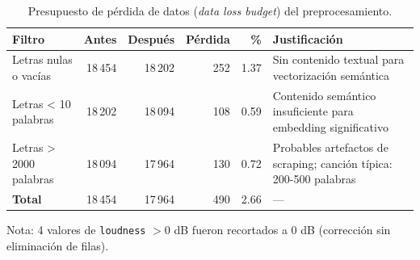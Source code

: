 \begin{table}[htbp]
\centering
\caption{Presupuesto de pérdida de datos (\textit{data loss budget}) del preprocesamiento.}
\label{tab:data_loss_budget}
\small
\begin{tabular}{lrrrrp{6cm}}
\toprule
Filtro & Antes & Después & Pérdida & \% & Justificación \\
\midrule
Letras nulas o vacías & 18\,454 & 18\,202 & 252 & 1.37 & Sin contenido textual para vectorización semántica \\
Letras < 10 palabras & 18\,202 & 18\,094 & 108 & 0.59 & Contenido semántico insuficiente para embedding significativo \\
Letras > 2000 palabras & 18\,094 & 17\,964 & 130 & 0.72 & Probables artefactos de scraping; canción típica: 200-500 palabras \\
\midrule
\textbf{Total} & 18\,454 & 17\,964 & 490 & 2.66 & --- \\
\bottomrule
\end{tabular}
\vspace{0.5em}
\footnotesize{Nota: 4 valores de \texttt{loudness} $> 0$ dB fueron recortados a 0 dB (corrección sin eliminación de filas).}
\end{table}